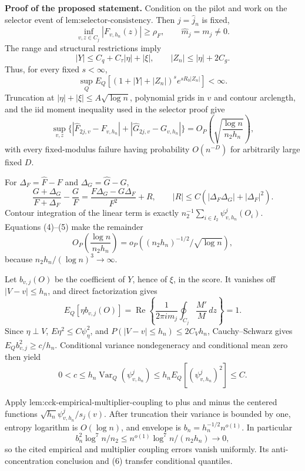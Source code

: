 \textbf{Proof of the proposed statement.}
Condition on the pilot and work on the selector event of \(\text{lem:selector-consistency}\).  Then \(j=\widehat j_n\) is fixed,
\[
 \inf_{v,z\in C_j}|F_{v,h_n}(z)|\ge\rho_F,
 \qquad \widehat m_j=m_j\ne0. \tag{1}
\]
The range and structural restrictions imply
\[
 |Y|\le C_q+C_\tau|\eta|+|\xi|,\qquad |Z_n|\le|\eta|+2C_g. \tag{2}
\]
Thus, for every fixed \(s<\infty\),
\[
 \sup_QE_Q[(1+|Y|+|Z_n|)^se^{sR_0|Z_n|}]<\infty. \tag{3}
\]
Truncation at \(|\eta|+|\xi|\le A\sqrt{\log n}\), polynomial grids in \(v\) and contour arclength, and the iid moment inequality used in the selector proof give
\[
 \sup_{v,z}\{|\widehat F_{2j,v}-F_{v,h_n}|+|\widehat G_{2j,v}-G_{v,h_n}|\}
 =O_P\left(\sqrt{\frac{\log n}{n_2h_n}}\right), \tag{4}
\]
with every fixed-modulus failure having probability \(O(n^{-D})\) for arbitrarily large fixed \(D\).

For \(\Delta_F=\widehat F-F\) and \(\Delta_G=\widehat G-G\),
\[
 \frac{G+\Delta_G}{F+\Delta_F}-\frac GF
 =\frac{F\Delta_G-G\Delta_F}{F^2}+R,
 \qquad |R|\le C(|\Delta_F\Delta_G|+|\Delta_F|^2). \tag{5}
\]
Contour integration of the linear term is exactly \(n_2^{-1}\sum_{i\in I_2}\psi^j_{v,h_n}(O_i)\).  Equations (4)--(5) make the remainder
\[
 O_P\left(\frac{\log n}{n_2h_n}\right)
 =o_P\left((n_2h_n)^{-1/2}/\sqrt{\log n}\right), \tag{6}
\]
because \(n_2h_n/(\log n)^3\to\infty\).

Let \(b_{v,j}(O)\) be the coefficient of \(Y\), hence of \(\xi\), in the score.  It vanishes off \(|V-v|\le h_n\), and direct factorization gives
\[
 E_Q[\eta b_{v,j}(O)]
 =\operatorname{Re}\left\{\frac1{2\pi i m_j}\oint_{C_j}\frac{M'}M\,dz\right\}=1. \tag{7}
\]
Since \(\eta\perp V\), \(E\eta^2\le C\psi_\eta^2\), and \(P(|V-v|\le h_n)\le2C_Vh_n\), Cauchy--Schwarz gives \(E_Qb_{v,j}^2\ge c/h_n\).  Conditional variance nondegeneracy and conditional mean zero then yield
\[
 0<c\le h_n\operatorname{Var}_Q(\psi^j_{v,h_n})
 \le h_nE_Q[(\psi^j_{v,h_n})^2]\le C. \tag{8}
\]

Apply \(\text{lem:cck-empirical-multiplier-coupling}\) to plus and minus the centered functions \(\sqrt{h_n}\psi^j_{v,h_n}/s_j(v)\).  After truncation their variance is bounded by one, entropy logarithm is \(O(\log n)\), and envelope is \(b_n=h_n^{-1/2}n^{o(1)}\).  In particular
\[
 b_n^2\log^7n/n_2\le n^{o(1)}\log^7n/(n_2h_n)\to0, \tag{9}
\]
so the cited empirical and multiplier coupling errors vanish uniformly.  Its anti-concentration conclusion and (6) transfer conditional quantiles.

